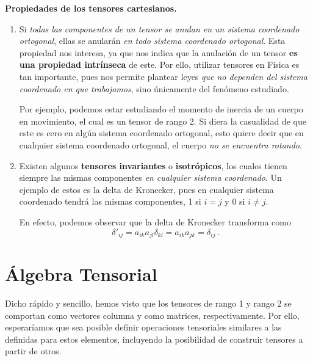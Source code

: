 \begin{propiedad}
    \textbf{Propiedades de los tensores cartesianos.}

    \begin{enumerate}
        \item Si \emph{todas las componentes de un tensor se anulan en un sistema coordenado ortogonal}, ellas se anularán \emph{en todo sistema coordenado ortogonal}.  Esta propiedad nos interesa, ya que nos indica que la anulación de un tensor \textbf{es una propiedad intrínseca} de este. Por ello, utilizar tensores en Física es tan importante, pues nos permite plantear leyes \emph{que no dependen del sistema coordenado en que trabajamos}, sino únicamente del fenómeno estudiado.
        
        Por ejemplo, podemos estar estudiando el momento de inercia de un cuerpo en movimiento, el cual es un tensor de rango 2. Si diera la casualidad de que este es cero en algún sistema coordenado ortogonal, esto quiere decir que en cualquier sistema coordenado ortogonal, el cuerpo \emph{no se encuentra rotando}.
    
        \item Existen algunos \textbf{tensores invariantes} o \textbf{isotrópicos}, los cuales tienen siempre las mismas componentes \emph{en cualquier sistema coordenado}. Un ejemplo de estos es la delta de Kronecker, pues en cualquier sistema coordenado tendrá las mismas componentes, 1 si $i=j$ y 0 si $i\neq j$.
        
        En efecto, podemos observar que la delta de Kronecker transforma como
        \begin{equation}
            \delta'_{ij} = a_{ik} a_{jl} \delta_{kl} = a_{ik} a_{jk} = \delta_{ij} \ .
        \end{equation}
    \end{enumerate}
\end{propiedad}



\section{Álgebra Tensorial}

Dicho rápido y sencillo, hemos visto que los tensores de rango 1 y rango 2 se comportan como vectores columna y como matrices, respectivamente. Por ello, esperaríamos que sea posible definir operaciones tensoriales similares a las definidas para estos elementos, incluyendo la posibilidad de construir tensores a partir de otros.

